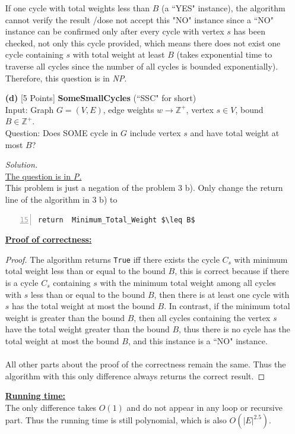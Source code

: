 \documentclass[10pt]{article}
\begin{document}
\begin{itemize}
\begin{mdframed}
        If one cycle with total weights less than $B$ (a ``YES" instance), the algorithm cannot verify the result /dose not accept this "NO" instance since a ``NO" instance can be confirmed only after every cycle with vertex $s$ has been checked, not only this cycle provided, which means there does not exist one cycle containing $s$ with total weight at least $B$ (takes exponential time to traverse all cycles since the number of all cycles is bounded exponentially). Therefore, this question is in \textit{NP}. 
    \end{mdframed}
    \item [\textbf{(d)}] {[5 Points]} \textbf{SomeSmallCycles} (``SSC" for short)\\
    Input: Graph $G = (V, E)$, edge weights $w \rightarrow \mathbb{Z}^+$, vertex $s \in V$, bound $B \in \mathbb{Z}^+$.\\
    Question: Does SOME cycle in $G$ include vertex $s$ and have total weight at most $B$?
    \begin{mdframed}
        \textit{Solution.}\\
        \underline{The question is in \textit{P.}}\\
        This problem is just a negation of the problem 3 b). Only change the return line of the algorithm in 3 b) to
        \begin{lstlisting}[mathescape=true, numbers=left, firstnumber=15]
    return  Minimum_Total_Weight $\leq B$
        \end{lstlisting}
        
        \underline{\textbf{Proof of correctness:}}
        \begin{proof}
        The algorithm returns \texttt{True} iff there exists the cycle $C_s$ with minimum total weight less than or equal to the bound $B$, this is correct because if there is a cycle $C_s$ containing $s$ with the minimum total weight among all cycles with $s$ less than or equal to the bound $B$, then there is at least one cycle with $s$ has the total weight at most the bound $B$. In contrast, if the minimum total weight is greater than the bound $B$, then all cycles containing the vertex $s$ have the total weight greater than the bound $B$, thus there is no cycle has the total weight at most the bound $B$, and this instance is a ``NO" instance.\\
        \\
        All other parts about the proof of the correctness remain the same. Thus the algorithm with this only difference always returns the correct result.
        \end{proof}
        
        \underline{\textbf{Running time:}}\\
        The only difference takes $O(1)$ and do not appear in any loop or recursive part. Thus the running time is still polynomial, which is also $O(|E|^{2.5})$.
    \end{mdframed}
\end{itemize}
\end{document}
